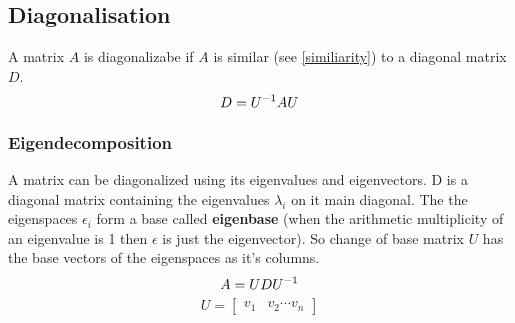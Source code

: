 \subsection{Diagonalisation}
A matrix $A$ is diagonalizabe if $A$ is similar (see \ref{similiarity}) to a diagonal matrix $D$.
\begin{equation*}
    D = U^{-1}AU \\
\end{equation*}
\subsubsection{Eigendecomposition}
A  matrix can be diagonalized using its eigenvalues and eigenvectors.
D is a diagonal matrix containing the eigenvalues $\lambda_i$ on it main diagonal.
The the eigenspaces $\epsilon_i$ form a base called \textbf{eigenbase} (when the arithmetic multiplicity of an eigenvalue is 1 then $\epsilon$ is just the eigenvector).
So change of base matrix $U$ has the base vectors of the eigenspaces as it's columns.
\begin{equation}
    A = U D U^{-1} \\
\end{equation}
\begin{equation}
    U = \begin{bmatrix}
        v_1 & v_2 \cdots v_n
    \end{bmatrix}
\end{equation}
